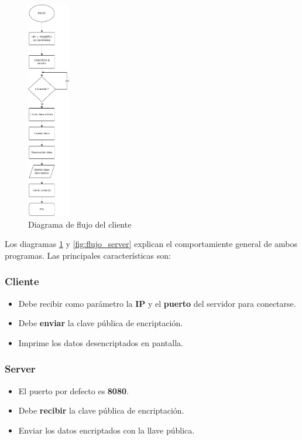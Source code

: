 \documentclass[letterpaper, 10 pt, conference]{ieeeconf}  %
\begin{document}
\begin{figure}[H]
	\centering
	\includegraphics[height=270pt]{./Imagenes/diag_flujo_cliente.png}
	\caption{Diagrama de flujo del cliente}
	\label{fig:flujo_cliente}
\end{figure}

Los diagramas \ref{fig:flujo_cliente} y \ref{fig:flujo_server} explican el comportamiente general de ambos programas. Las principales características son:

\subsubsection{Cliente}
\begin{itemize}
	\item Debe recibir como parámetro la \textbf{IP} y el \textbf{puerto} del servidor para conectarse.
	\item Debe \textbf{enviar} la clave pública de encriptación.
	\item Imprime los datos desencriptados en pantalla.
\end{itemize}

\subsubsection{Server}
\begin{itemize}
	\item El puerto por defecto es \textbf{8080}.
	\item Debe \textbf{recibir} la clave pública de encriptación.
	\item Enviar los datos encriptados con la llave pública.
\end{itemize}
\end{document}
